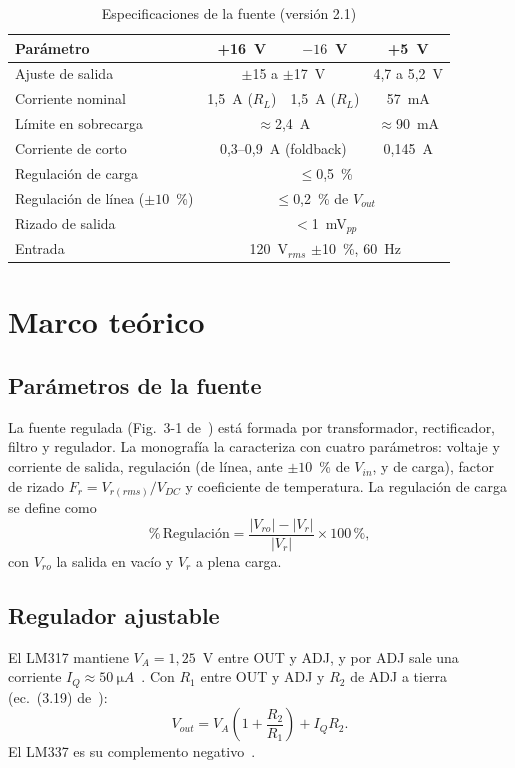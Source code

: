 \documentclass[conference]{IEEEtran}
\begin{document}
\begin{table}[htbp]
\caption{Especificaciones de la fuente (versión 2.1)}
\label{tab:espec}
\centering
\footnotesize
\begin{tabular}{@{}lccc@{}}
\toprule
Parámetro & +16~V & $-16$~V & +5~V \\
\midrule
Ajuste de salida & \multicolumn{2}{c}{$\pm$15 a $\pm$17~V} & 4,7 a 5,2~V \\
Corriente nominal & 1,5~A ($R_L$) & 1,5~A ($R_L$) & 57~mA \\
Límite en sobrecarga & \multicolumn{2}{c}{$\approx$2,4~A} & $\approx$90~mA \\
Corriente de corto & \multicolumn{2}{c}{0,3--0,9~A (foldback)} & 0,145~A \\
Regulación de carga & \multicolumn{3}{c}{$\leq$0,5~\%} \\
Regulación de línea ($\pm10$~\%) & \multicolumn{3}{c}{$\leq$0,2~\% de $V_{out}$} \\
Rizado de salida & \multicolumn{3}{c}{$<$1~mV$_{pp}$} \\
Entrada & \multicolumn{3}{c}{120~V$_{rms}$ $\pm$10~\%, 60~Hz} \\
\bottomrule
\end{tabular}
\end{table}

\section{Marco teórico}
\subsection{Parámetros de la fuente}
La fuente regulada (Fig.~3-1 de~\cite{monografia}) está formada por transformador, rectificador, filtro y regulador. La monografía la caracteriza con cuatro parámetros: voltaje y corriente de salida, regulación (de línea, ante $\pm10$~\% de $V_{in}$, y de carga), factor de rizado $F_r=V_{r(rms)}/V_{DC}$ y coeficiente de temperatura. La regulación de carga se define como
\begin{equation}
\%\,\text{Regulación}=\frac{|V_{ro}|-|V_r|}{|V_r|}\times100\,\%,
\label{eq:reg}
\end{equation}
con $V_{ro}$ la salida en vacío y $V_r$ a plena carga.

\subsection{Regulador ajustable}
El LM317 mantiene $V_A=1{,}25$~V entre OUT y ADJ, y por ADJ sale una corriente $I_Q\approx\SI{50}{\micro A}$~\cite{lm317}. Con $R_1$ entre OUT y ADJ y $R_2$ de ADJ a tierra (ec.~(3.19) de~\cite{monografia}):
\begin{equation}
V_{out}=V_A\left(1+\frac{R_2}{R_1}\right)+I_Q R_2 .
\label{eq:vout}
\end{equation}
El LM337 es su complemento negativo~\cite{lm337}.
\end{document}
